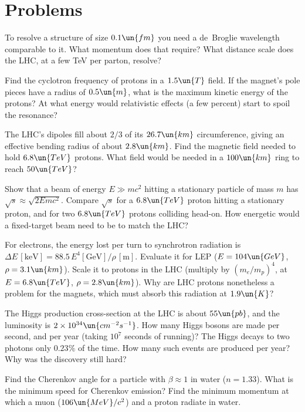 \section{Problems}

\begin{problems}
\core To resolve a structure of size $0.1\un{fm}$ you need a de~Broglie wavelength comparable to it. What momentum does that require? What distance scale does the LHC, at a few TeV per parton, resolve?

 Find the cyclotron frequency of protons in a $1.5\un{T}$ field. If the magnet's pole pieces have a radius of $0.5\un{m}$, what is the maximum kinetic energy of the protons? At what energy would relativistic effects (a few percent) start to spoil the resonance?

\core The LHC's dipoles fill about $2/3$ of its $26.7\un{km}$ circumference, giving an effective bending radius of about $2.8\un{km}$. Find the magnetic field needed to hold $6.8\un{TeV}$ protons. What field would be needed in a $100\un{km}$ ring to reach $50\un{TeV}$?

\core \label{prob:fixed-target} Show that a beam of energy $E\gg mc^2$ hitting a stationary particle of mass $m$ has $\sqrt s\approx\sqrt{2Emc^2}$. Compare $\sqrt s$ for a $6.8\un{TeV}$ proton hitting a stationary proton, and for two $6.8\un{TeV}$ protons colliding head-on. How energetic would a fixed-target beam need to be to match the LHC?

\core \label{prob:synchrotron} For electrons, the energy lost per turn to synchrotron radiation is $\Delta E\,[\mathrm{keV}] = 88.5\,E^4[\mathrm{GeV}]/\rho\,[\mathrm{m}]$. Evaluate it for LEP ($E = 104\un{GeV}$, $\rho = 3.1\un{km}$). Scale it to protons in the LHC (multiply by $(m_e/m_p)^4$, at $E = 6.8\un{TeV}$, $\rho = 2.8\un{km}$). Why are LHC protons nonetheless a problem for the magnets, which must absorb this radiation at $1.9\un{K}$?

 \label{prob:higgs-rate} The Higgs production cross-section at the LHC is about $55\un{pb}$, and the luminosity is $2\times10^{34}\un{cm^{-2}s^{-1}}$. How many Higgs bosons are made per second, and per year (taking $10^7$ seconds of running)? The Higgs decays to two photons only $0.23\%$ of the time. How many such events are produced per year? Why was the discovery still hard?

 Find the Cherenkov angle for a particle with $\beta\approx1$ in water ($n = 1.33$). What is the minimum speed for Cherenkov emission? Find the minimum momentum at which a muon ($106\un{MeV}/c^2$) and a proton radiate in water.


\end{problems}
